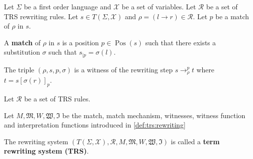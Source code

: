 \documentclass{book}
\begin{document}
   
  \begin{definition}
    \label{def:trs:rewriting}
    Let $\Sigma$ be a first order language and $\mathcal{X}$ be a set of variables. Let $\mathcal{R}$ be a set of TRS rewriting rules. Let $s \in T(\Sigma, \mathcal{X})$ and $\rho = (l \to r) \in \mathcal{R}$. Let $p$ be a match of $\rho$ in $s$.

      A \textbf{match} of $\rho$ in $s$ is a position $p \in \operatorname{Pos}(s)$ such that there exists a substitution $\sigma$ such that $s_{|p} = \sigma(l)$.

    The triple $(\rho, s, p, \sigma)$ is a witness of the rewriting step $s \to_\rho^p t$ where $t = s[\sigma(r)]_p$.
  \end{definition}
  
  \begin{definition}
    Let $\mathcal{R}$ be a set of TRS rules. 

    Let $M, \mathfrak{M}, W , \mathfrak{W}, \mathfrak{I}$ be the match, match mechanism, witnesses, witness function and interpretation functions introduced in \autoref{def:trs:rewriting}
 
    The rewriting system $(T(\Sigma,\mathcal{X}), \mathcal{R}, M, \mathfrak{M}, W, \mathfrak{W}, \mathfrak{I})$ is called a \textbf{term rewriting system (TRS)}.
  \end{definition}

\end{document}
